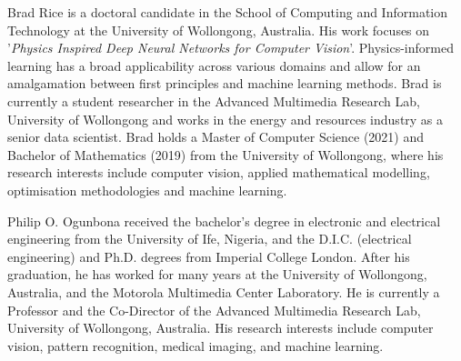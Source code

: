\documentclass[conference, a4paper]{IEEEtran}
\begin{document}

\begin{IEEEbiography}{Brad Rice}
	is a doctoral candidate in the School of Computing and Information Technology at the University of Wollongong, Australia. His work focuses on '\textit{Physics Inspired Deep Neural Networks for Computer Vision}'. Physics-informed learning has a broad applicability across various domains and allow for an amalgamation between first principles and machine learning methods. Brad is currently a student researcher in the Advanced Multimedia Research Lab, University of Wollongong and works in the energy and resources industry as a senior data scientist. Brad holds a Master of Computer Science (2021) and Bachelor of Mathematics (2019) from the University of Wollongong, where his research interests include computer vision, applied mathematical modelling, optimisation methodologies and machine learning.
\end{IEEEbiography}


\begin{IEEEbiography}{Philip O. Ogunbona}
	received the bachelor’s degree in electronic and electrical engineering from the University of Ife, Nigeria, and the D.I.C. (electrical engineering) and Ph.D. degrees from Imperial College London. After his graduation, he has worked for many years at the University of Wollongong, Australia, and the Motorola Multimedia Center Laboratory. He is currently a Professor and the Co-Director of the Advanced Multimedia Research Lab, University of Wollongong, Australia. His research interests include computer vision, pattern recognition, medical imaging, and machine learning.
\end{IEEEbiography}


\vfill
\end{document}
